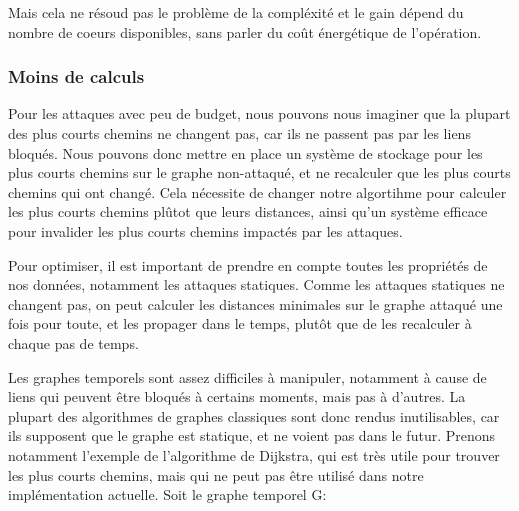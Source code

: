 \subsubsubsection*{}
Mais cela ne résoud pas le problème de la compléxité et le gain dépend du nombre de coeurs disponibles, sans parler du coût énergétique de l'opération.

\subsubsection{Moins de calculs}\label{subsubsec:moins_de_calculs}

\label{subsubsubsec:cache}
Pour les attaques avec peu de budget, nous pouvons nous imaginer que la plupart des plus courts chemins ne changent pas, car ils ne passent pas par les liens bloqués.
Nous pouvons donc mettre en place un système de stockage pour les plus courts chemins sur le graphe non-attaqué, et ne recalculer que les plus courts chemins qui ont changé.
Cela nécessite de changer notre algortihme pour calculer les plus courts chemins plûtot que leurs distances, ainsi qu'un système efficace pour invalider les plus courts chemins impactés par les attaques.

\label{subsubsubsec:proprietes_attaques_statiques}
Pour optimiser, il est important de prendre en compte toutes les propriétés de nos données, notamment les attaques statiques.
Comme les attaques statiques ne changent pas, on peut calculer les distances minimales sur le graphe attaqué une fois pour toute, et les propager dans le temps, plutôt que de les recalculer à chaque pas de temps.


\label{subsubsubsec:structure_de_donnees_opti}
Les graphes temporels sont assez difficiles à manipuler, notamment à cause de liens qui peuvent être bloqués à certains moments, mais pas à d'autres.
La plupart des algorithmes de graphes classiques sont donc rendus inutilisables, car ils supposent que le graphe est statique, et ne voient pas dans le futur.
Prenons notamment l'exemple de l'algorithme de Dijkstra, qui est très utile pour trouver les plus courts chemins, mais qui ne peut pas être utilisé dans notre implémentation actuelle.
Soit le graphe temporel G:\newline

